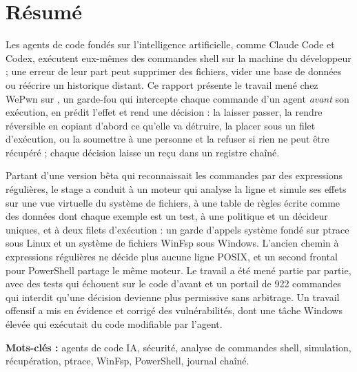 \chapter*{Résumé}

Les agents de code fondés sur l'intelligence artificielle, comme Claude Code et Codex,
exécutent eux-mêmes des commandes shell sur la machine du développeur ; une erreur de leur
part peut supprimer des fichiers, vider une base de données ou réécrire un historique distant.
Ce rapport présente le travail mené chez WePwn sur \demo{}, un garde-fou qui intercepte chaque
commande d'un agent \emph{avant} son exécution, en prédit l'effet et rend une décision : la
laisser passer, la rendre réversible en copiant d'abord ce qu'elle va détruire, la placer sous
un filet d'exécution, ou la soumettre à une personne et la refuser si rien ne peut être
récupéré ; chaque décision laisse un reçu dans un registre chaîné.

Partant d'une version bêta qui reconnaissait les commandes par des expressions régulières, le
stage a conduit à un moteur qui analyse la ligne et simule ses effets sur une vue virtuelle du
système de fichiers, à une table de règles écrite comme des données dont chaque exemple est un
test, à une politique et un décideur uniques, et à deux filets d'exécution : un garde d'appels
système fondé sur ptrace sous Linux et un système de fichiers WinFsp sous Windows. L'ancien chemin
à expressions régulières ne décide plus aucune ligne POSIX, et un second frontal pour
PowerShell partage le même moteur. Le travail a été mené partie par partie, avec
des tests qui échouent sur le code d'avant et un portail de 922 commandes qui interdit qu'une
décision devienne plus permissive sans arbitrage. Un travail offensif a mis en évidence et
corrigé des vulnérabilités, dont une tâche Windows élevée qui exécutait du code modifiable par
l'agent.

\medskip
\noindent\textbf{Mots-clés :} agents de code IA, sécurité, analyse de commandes shell,
simulation, récupération, ptrace, WinFsp, PowerShell, journal chaîné.
